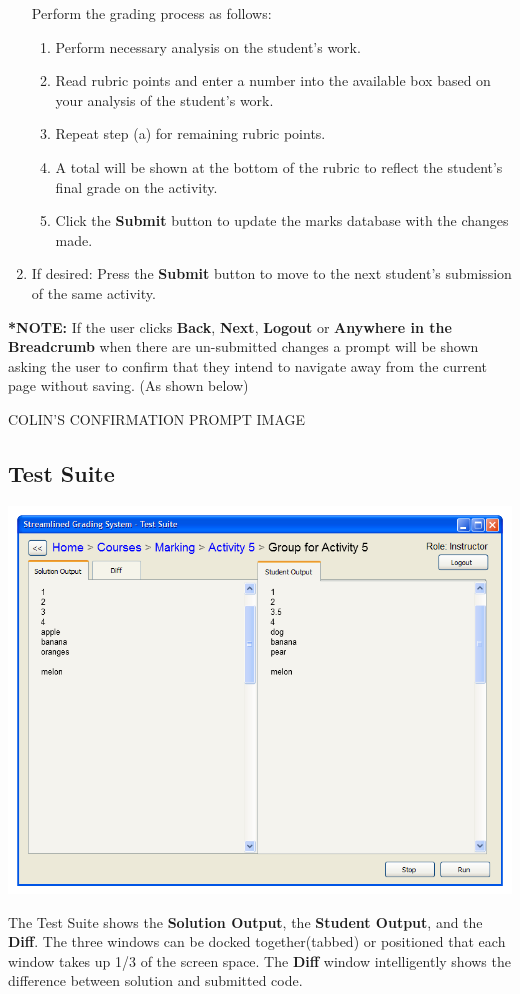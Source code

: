 \documentclass{article}
\begin{document}
\begin{enumerate}
\begin{center}
    \end{center}
    Perform the grading process as follows:
    \begin{enumerate}
      \item Perform necessary analysis on the student's work. 
      \item Read rubric points and enter a number into the available box 
      based on your analysis of the student's work.
      \item Repeat step (a) for remaining rubric points.
      \item A total will be shown at the bottom of the rubric to reflect the
       student's final grade on the activity.
      \item Click the \textbf{Submit} button to update the marks database with
      the changes made.
    \end{enumerate}

	\item If desired: Press the \textbf{Submit} button to move to the next student's
	submission of the same activity.
\end{enumerate}
\textbf{*NOTE: }If the user clicks \textbf{Back}, \textbf{Next}, \textbf{Logout} or \textbf{Anywhere in the Breadcrumb} when there are un-submitted changes a prompt will be shown asking the user to confirm that they intend to navigate away from the current page without saving. (As shown below)

	\begin{center}
      COLIN'S CONFIRMATION PROMPT IMAGE
    \end{center}

\subsection{Test Suite}
\begin{center}
\includegraphics[scale=0.6]{../images/UIMockups/PNG_Renders/SRS_TestSuite_Split}
\end{center}
The Test Suite shows the \textbf{Solution Output}, the \textbf{Student Output}, and the \textbf{Diff}.  
The three windows can be docked together(tabbed) or positioned that each
window takes up 1/3 of the screen space.
The \textbf{Diff} window intelligently shows the difference between
solution and submitted code.
\end{document}
